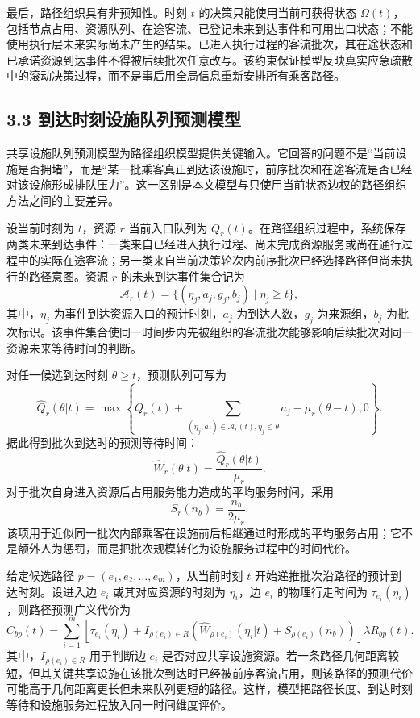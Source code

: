 \documentclass[UTF8,a4paper,12pt]{ctexart}
\begin{document}
最后，路径组织具有非预知性。时刻 \(t\) 的决策只能使用当前可获得状态 \(\Omega(t)\)，包括节点占用、资源队列、在途客流、已登记未来到达事件和可用出口状态；不能使用执行层未来实际尚未产生的结果。已进入执行过程的客流批次，其在途状态和已承诺资源到达事件不得被后续批次任意改写。该约束保证模型反映真实应急疏散中的滚动决策过程，而不是事后用全局信息重新安排所有乘客路径。

\subsection{3.3 到达时刻设施队列预测模型}

共享设施队列预测模型为路径组织模型提供关键输入。它回答的问题不是“当前设施是否拥堵”，而是“某一批乘客真正到达该设施时，前序批次和在途客流是否已经对该设施形成排队压力”。这一区别是本文模型与只使用当前状态边权的路径组织方法之间的主要差异。

设当前时刻为 \(t\)，资源 \(r\) 当前入口队列为 \(Q_r(t)\)。在路径组织过程中，系统保存两类未来到达事件：一类来自已经进入执行过程、尚未完成资源服务或尚在通行过程中的实际在途客流；另一类来自当前决策轮次内前序批次已经选择路径但尚未执行的路径意图。资源 \(r\) 的未来到达事件集合记为
\[
\mathcal A_r(t)=\{(\eta_j,a_j,g_j,b_j)\mid \eta_j\geq t\},
\]
其中，\(\eta_j\) 为事件到达资源入口的预计时刻，\(a_j\) 为到达人数，\(g_j\) 为来源组，\(b_j\) 为批次标识。该事件集合使同一时间步内先被组织的客流批次能够影响后续批次对同一资源未来等待时间的判断。

对任一候选到达时刻 \(\theta\geq t\)，预测队列可写为
\[
\widehat Q_r(\theta|t)=
\max\left\{
Q_r(t)+\sum_{(\eta_j,a_j)\in\mathcal A_r(t),\eta_j\leq \theta}a_j
-\mu_r(\theta-t),0
\right\}.
\]
据此得到批次到达时的预测等待时间：
\[
\widehat W_r(\theta|t)=\frac{\widehat Q_r(\theta|t)}{\mu_r}.
\]
对于批次自身进入资源后占用服务能力造成的平均服务时间，采用
\[
S_r(n_b)=\frac{n_b}{2\mu_r}.
\]
该项用于近似同一批次内部乘客在设施前后相继通过时形成的平均服务占用；它不是额外人为惩罚，而是把批次规模转化为设施服务过程中的时间代价。

给定候选路径 \(p=(e_1,e_2,\ldots,e_m)\)，从当前时刻 \(t\) 开始递推批次沿路径的预计到达时刻。设进入边 \(e_i\) 或其对应资源的时刻为 \(\eta_i\)，边 \(e_i\) 的物理行走时间为 \(\tau_{e_i}(\eta_i)\)，则路径预测广义代价为
\[
\widehat C_{bp}(t)=
\sum_{i=1}^{m}
\left[
\tau_{e_i}(\eta_i)+
I_{\rho(e_i)\in R}
\left(
\widehat W_{\rho(e_i)}(\eta_i|t)+S_{\rho(e_i)}(n_b)
\right)
\right]
\lambda R_{bp}(t).
\]
其中，\(I_{\rho(e_i)\in R}\) 用于判断边 \(e_i\) 是否对应共享设施资源。若一条路径几何距离较短，但其关键共享设施在该批次到达时已经被前序客流占用，则该路径的预测代价可能高于几何距离更长但未来队列更短的路径。这样，模型把路径长度、到达时刻等待和设施服务过程放入同一时间维度评价。
\end{document}
